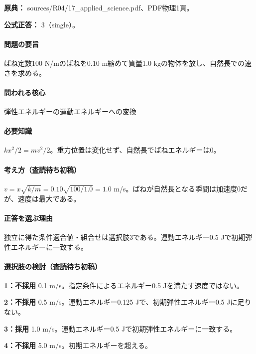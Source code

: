 \noindent\textbf{原典：} sources/R04/17\_applied\_science.pdf、PDF物理1頁。

\textbf{公式正答：} 3（single）。

\paragraph{問題の要旨} ばね定数100 N/mのばねを0.10 m縮めて質量1.0 kgの物体を放し、自然長での速さを求める。

\paragraph{問われる核心} 弾性エネルギーの運動エネルギーへの変換

\paragraph{必要知識} \(kx^2/2=mv^2/2\)。重力位置は変化せず、自然長でばねエネルギーは0。

\paragraph{考え方（査読待ち初稿）} \(v=x\sqrt{k/m}=0.10\sqrt{100/1.0}=1.0\) m/s。ばねが自然長となる瞬間は加速度0だが、速度は最大である。

\paragraph{正答を選ぶ理由} 独立に得た条件適合値・組合せは選択肢3である。運動エネルギー0.5 Jで初期弾性エネルギーに一致する。

\paragraph{選択肢の検討（査読待ち初稿）}

\noindent\textbf{1：不採用} 0.1 m/s。指定条件によるエネルギー0.5 Jを満たす速度ではない。\par

\noindent\textbf{2：不採用} 0.5 m/s。運動エネルギー0.125 Jで、初期弾性エネルギー0.5 Jに足りない。\par

\noindent\textbf{3：採用} 1.0 m/s。運動エネルギー0.5 Jで初期弾性エネルギーに一致する。\par

\noindent\textbf{4：不採用} 5.0 m/s。初期エネルギーを超える。\par

